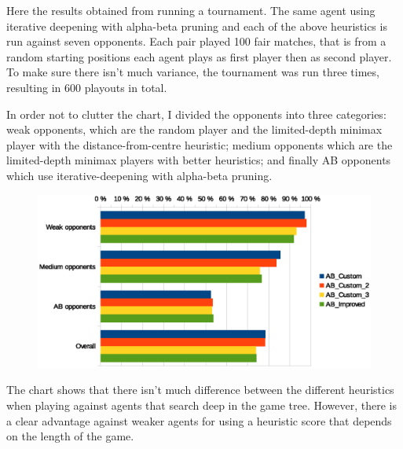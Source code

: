 \documentclass[11pt]{article}
\begin{document}
Here the results obtained from running a tournament. The same agent using iterative deepening with alpha-beta pruning and each of the above heuristics is run against seven opponents. Each pair played 100 fair matches, that is from a random starting positions each agent plays as first player then as second player. To make sure there isn't much variance, the tournament was run three times, resulting in 600 playouts in total.

In order not to clutter the chart, I divided the opponents into three categories: weak opponents, which are the random player and the limited-depth minimax player with the distance-from-centre heuristic; medium opponents which are the limited-depth minimax players with better heuristics; and finally AB opponents which use iterative-deepening with alpha-beta pruning.

\begin{figure}\label{chart}
  \includegraphics[width=\textwidth]{chart.eps}
\end{figure}

The chart shows that there isn't much difference between the different heuristics when playing against agents that search deep in the game tree. However, there is a clear advantage against weaker agents for using a heuristic score that depends on the length of the game.
\end{document}
